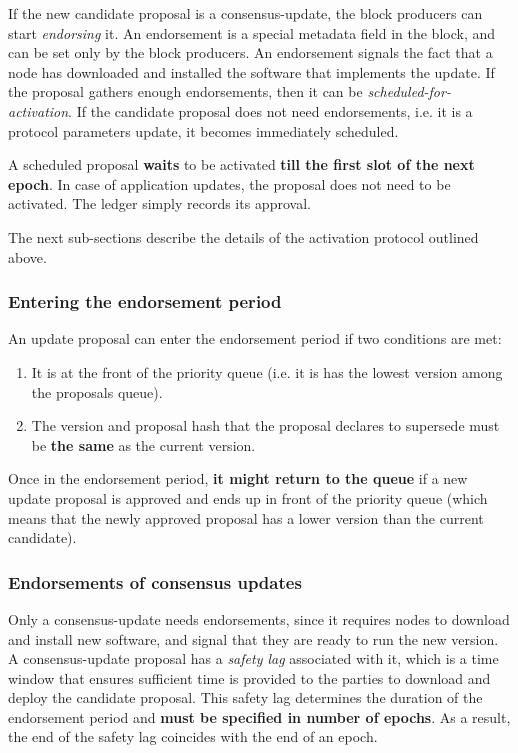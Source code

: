 If the new candidate proposal is a consensus-update, the block producers can
start \emph{endorsing} it. An endorsement is a special metadata field in the
block, and can be set only by the block producers. An endorsement signals the
fact that a node has downloaded and installed the software that implements the
update.
%
If the proposal gathers enough endorsements, then it can be
\emph{scheduled-for-activation}.
%
If the candidate proposal does not need endorsements, i.e. it is a protocol
parameters update, it becomes immediately scheduled.

A scheduled proposal \textbf{waits} to be activated \textbf{till the first slot
  of the next epoch}. In case of application updates, the proposal does not need
to be activated. The ledger simply records its approval.

The next sub-sections describe the details of the activation protocol outlined
above.

\subsubsection{Entering the endorsement period}
\label{sec:entering-the-endorsement-phase}

An update proposal can enter the endorsement period if two conditions are met:
\begin{enumerate}
\item It is at the front of the priority queue (i.e. it is has the lowest
  version among the proposals queue).
\item The version and proposal hash that the proposal declares to supersede must
  be \textbf{the same} as the current version.
\end{enumerate}
Once in the endorsement period, \textbf{it might return to the queue} if a new
update proposal is approved and ends up in front of the priority queue (which
means that the newly approved proposal has a lower version than the current
candidate).

\subsubsection{Endorsements of consensus updates}
\label{sec:endorsemnts}

Only a consensus-update needs endorsements, since it requires nodes to download
and install new software, and signal that they are ready to run the new version.
A consensus-update proposal has a \emph{safety lag} associated with it, which is
a time window that ensures sufficient time is provided to the parties to
download and deploy the candidate proposal. This safety lag determines the
duration of the endorsement period and \textbf{must be specified in number of
  epochs}. As a result, the end of the safety lag coincides with the end of an
epoch.

